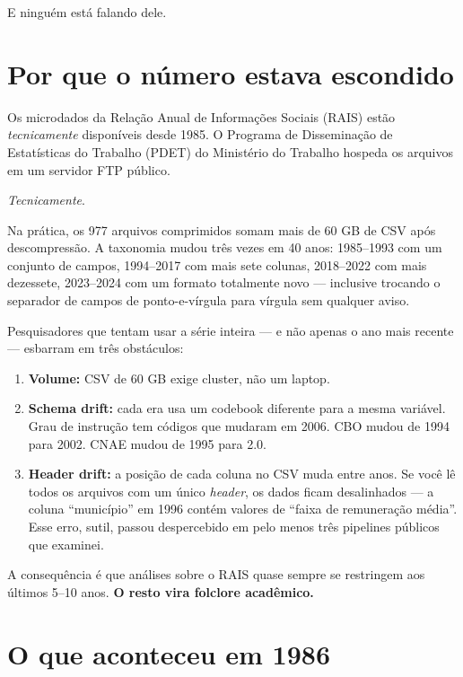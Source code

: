 \documentclass[12pt,a4paper,oneside]{article}
\begin{document}
E ninguém está falando dele.

\section*{Por que o número estava escondido}

Os microdados da Relação Anual de Informações Sociais (RAIS) estão
\textit{tecnicamente} disponíveis desde 1985. O Programa de Disseminação
de Estatísticas do Trabalho (PDET) do Ministério do Trabalho hospeda os
arquivos em um servidor FTP público.

\textit{Tecnicamente}.

Na prática, os 977 arquivos comprimidos somam mais de 60 GB de CSV após
descompressão. A taxonomia mudou três vezes em 40 anos: 1985--1993 com
um conjunto de campos, 1994--2017 com mais sete colunas, 2018--2022 com
mais dezessete, 2023--2024 com um formato totalmente novo --- inclusive
trocando o separador de campos de ponto-e-vírgula para vírgula sem
qualquer aviso.

Pesquisadores que tentam usar a série inteira --- e não apenas o ano mais
recente --- esbarram em três obstáculos:

\begin{enumerate}
  \item \textbf{Volume:} CSV de 60 GB exige cluster, não um laptop.
  \item \textbf{Schema drift:} cada era usa um codebook diferente para
        a mesma variável. Grau de instrução tem códigos que mudaram em
        2006. CBO mudou de 1994 para 2002. CNAE mudou de 1995 para 2.0.
  \item \textbf{Header drift:} a posição de cada coluna no CSV muda entre
        anos. Se você lê todos os arquivos com um único \textit{header},
        os dados ficam desalinhados --- a coluna ``município'' em 1996
        contém valores de ``faixa de remuneração média''. Esse erro,
        sutil, passou despercebido em pelo menos três pipelines públicos
        que examinei.
\end{enumerate}

A consequência é que análises sobre o RAIS quase sempre se restringem
aos últimos 5--10 anos. \textbf{O resto vira folclore acadêmico.}

\section*{O que aconteceu em 1986}
\end{document}
